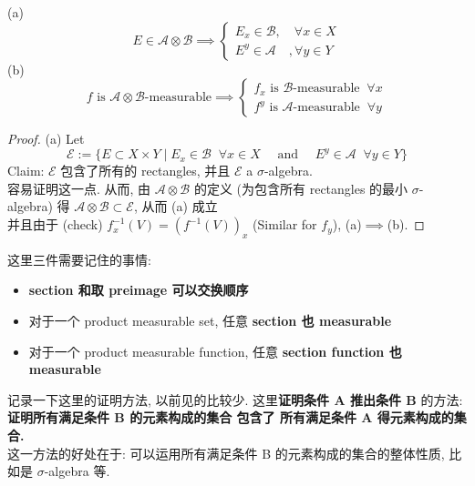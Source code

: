 \documentclass[lang=cn,11pt]{elegantbook}
\begin{document}
\begin{proposition}
(a) $$E \in \mathcal{A} \otimes \mathcal{B} \implies \begin{cases}
        E_x \in \mathcal{B},\quad \forall x \in X\\
        E^y \in \mathcal{A}\quad, \forall y \in Y
    \end{cases}$$ (b) $$ f \text{ is } \mathcal{A} \otimes \mathcal{B}\text{-measurable} \implies \begin{cases}
        f_x \text{ is } \mathcal{B}\text{-measurable} \;\;\forall x \\
         f^y \text{ is }  \mathcal{A}\text{-measurable} \;\;\forall y
    \end{cases}$$
\end{proposition}

\begin{proof}
    (a) Let $$\mathcal{E}:= \{    E \subset X \times Y \mid  E_x \in \mathcal{B}\;\; \forall x \in X \quad\text{ and }\quad E^y \in \mathcal{A}\;\;\forall y \in Y  \}$$
Claim: $\mathcal{E}$ 包含了所有的 rectangles, 并且 $\mathcal{E}$ a $\sigma$-algebra.\\
容易证明这一点. 从而, 由 $\mathcal{A} \otimes \mathcal{B}$ 的定义 (为包含所有 rectangles 的最小 $\sigma$-algebra) 得  $\mathcal{A} \otimes \mathcal{B} \subset \mathcal{E}$, 从而 (a) 成立\\
并且由于 (check) $f_x^{-1} (V) = (f^{-1}(V) )_x$ (Similar for $f_y$),  (a)$\implies$(b).
\end{proof}
\begin{remark}
    这里三件需要记住的事情:
    \begin{itemize}
        \item \textbf{section 和取 preimage 可以交换顺序}
        \item 对于一个 product measurable set, 任意 \textbf{section 也 measurable}
        \item 对于一个 product measurable function, 任意 \textbf{section function 也 measurable}
    \end{itemize}
\end{remark}
\begin{remark}
    记录一下这里的证明方法, 以前见的比较少. 这里\textbf{证明条件 A 推出条件 B} 的方法: \textbf{证明所有满足条件 B 的元素构成的集合 包含了 所有满足条件 A 得元素构成的集合.} \\
    这一方法的好处在于: 可以运用所有满足条件 B 的元素构成的集合的整体性质, 比如是 $\sigma$-algebra 等.
\end{remark}
\end{document}

